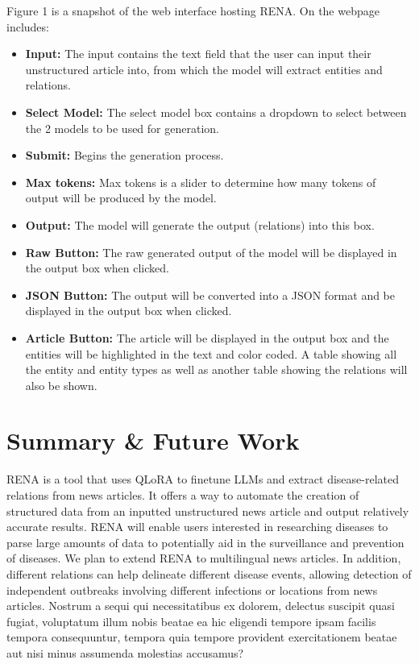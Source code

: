 \documentclass[letterpaper]{article} %
\begin{document}
Figure 1 is a snapshot of the web interface hosting RENA. On the webpage includes:
\begin{itemize}
    \item \textbf{Input:} The input contains the text field that the user can input their unstructured article into, from which the model will extract entities and relations.
    \item \textbf{Select Model:} The select model box contains a dropdown to select between the 2 models to be used for generation.
    \item \textbf{Submit:} Begins the generation process.
    \item \textbf{Max tokens:} Max tokens is a slider to determine how many tokens of output will be produced by the model.
    \item \textbf{Output:} The model will generate the output (relations) into this box.
    \item \textbf{Raw Button:} The raw generated output of the model will be displayed in the output box when clicked.
    \item \textbf{JSON Button:} The output will be converted into a JSON format and be displayed in the output box when clicked.
    \item \textbf{Article Button:} The article will be displayed in the output box and the entities will be highlighted in the text and color coded. A table showing all the entity and entity types as well as another table showing the relations will also be shown.
\end{itemize}


\section{Summary \& Future Work}
RENA is a tool that uses QLoRA to finetune LLMs and extract disease-related relations from news articles. It offers a way to automate the creation of structured data from an inputted unstructured news article and output relatively accurate results. RENA will enable users interested in researching diseases to parse large amounts of data to potentially aid in the surveillance and prevention of diseases. We plan to extend RENA to multilingual news articles. In addition, different relations can help delineate different disease events, allowing detection of independent outbreaks involving different infections or locations from news articles.
Nostrum a sequi qui necessitatibus ex dolorem, delectus suscipit quasi fugiat, voluptatum illum nobis beatae ea hic eligendi tempore ipsam facilis tempora consequuntur, tempora quia tempore provident exercitationem beatae aut nisi minus assumenda molestias accusamus?\clearpage

\end{document}
